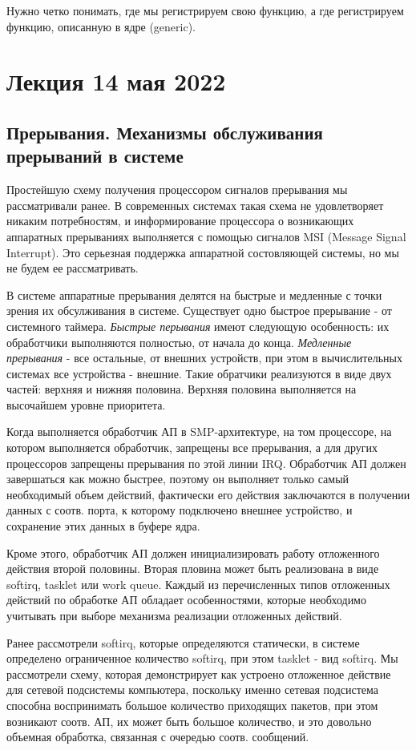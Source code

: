 \documentclass[12pt,a4paper]{scrreprt}
\begin{document}
Нужно четко понимать, где мы регистрируем свою функцию, а где регистрируем функцию, описанную в ядре (generic).

\chapter{\textbf{Лекция 14 мая 2022}}

\section{Прерывания. Механизмы обслуживания прерываний в системе}

Простейшую схему получения процессором сигналов прерывания мы рассматривали ранее. В современных системах такая схема не удовлетворяет никаким потребностям, и информирование процессора о возникающих аппаратных прерываниях выполняется с помощью сигналов MSI (Message Signal Interrupt). Это серьезная поддержка аппаратной состовляющей системы, но мы не будем ее рассматривать.

В системе аппаратные прерывания делятся на быстрые и медленные с точки зрения их обсулживания в системе. Существует одно быстрое прерывание - от системного таймера. \textit{Быстрые перывания} имеют следующую особенность: их обработчики выполняются полностью, от начала до конца. \textit{Медленные прерывания} - все остальные, от внешних устройств, при этом в вычислительных системах все устройства - внешние. Такие обратчики реализуются в виде двух частей: верхняя и нижняя половина. Верхняя половина выполняется на высочайшем уровне приоритета. 

Когда выполняется обработчик АП в SMP-архитектуре, на том процессоре, на котором выполняется обработчик, запрещены все прерывания, а для других процессоров запрещены прерывания по этой линии IRQ. Обработчик АП должен завершаться как можно быстрее, поэтому он выполняет только самый необходимый объем действий, фактически его действия заключаются в получении данных с соотв. порта, к которому подключено внешнее устройство, и сохранение этих данных в буфере ядра. 

Кроме этого, обработчик АП должен инициализировать работу отложенного действия второй половины. Вторая пловина может быть реализована в виде softirq, tasklet или work queue. Каждый из перечисленных типов отложенных действий по обработке АП обладает особенностями, которые необходимо учитывать при выборе механизма реализации отложенных действий. 

Ранее рассмотрели softirq, которые определяются статически, в системе определено ограниченное количество softirq, при этом tasklet - вид softirq. Мы рассмотрели схему, которая демонстрирует как устроено отложенное действие для сетевой подсистемы компьютера, поскольку именно сетевая подсистема способна воспринимать большое количество приходящих пакетов, при этом возникают соотв. АП, их может быть большое количество, и это довольно объемная обработка, связанная с очередью соотв. сообщений. 
\end{document}
